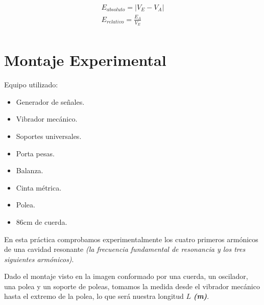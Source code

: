 \documentclass[twocolumn, 12pt]{article}
\newcommand{\bolditalic}[1]{\textbf{\textit{#1}}}
\begin{document}
{\large
    \begin{equation}
        \begin{gathered}
            E_{absoluto} = \left\lvert V_E - V_A\right\rvert \\
            E_{relativo} = \frac{E_A}{V_E} \\
        \end{gathered}
        \label{eq:calculo-errores}
    \end{equation}
}

\section{Montaje Experimental}

\begin{figure}[H]
    \begin{center}
    \end{center}
    \caption{}
\end{figure}

Equipo utilizado:

\begin{itemize}[label=$\triangleright$]
    \item Generador de señales. 

    \item Vibrador mecánico. 

    \item Soportes universales.

    \item Porta pesas. 

    \item Balanza.

    \item Cinta métrica. 

    \item Polea.

    \item 86cm de cuerda.
\end{itemize}

En esta práctica comprobamos experimentalmente los cuatro primeros armónicos de 
una cavidad resonante \textit{(la frecuencia fundamental de resonancia y los tres siguientes armónicos)}.

Dado el montaje visto en la imagen conformado por una cuerda, un oscilador, 
una polea y un soporte de poleas, tomamos la medida desde el vibrador mecánico 
hasta el extremo de la polea, lo que será nuestra longitud $L$ \bolditalic{(m)}.
\end{document}
